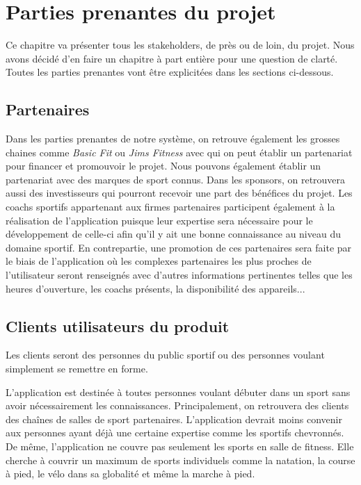 \chapter{Parties prenantes du projet}

Ce chapitre va présenter tous les stakeholders, de près ou de loin, du projet. Nous avons décidé d'en faire un chapitre à part entière pour une question de clarté. Toutes les parties prenantes vont être explicitées dans les sections ci-dessous.

\section{Partenaires}

Dans les parties prenantes de notre système, on retrouve également les grosses chaines comme \textit{Basic Fit} ou \textit{Jims Fitness} avec qui on peut établir un partenariat pour financer et promouvoir le projet. Nous pouvons également établir un partenariat avec des marques de sport connus. Dans les sponsors, on retrouvera aussi des investisseurs qui pourront recevoir une part des bénéfices du projet. Les coachs sportifs appartenant aux firmes partenaires participent également à la réalisation de l'application puisque leur expertise sera nécessaire pour le développement de celle-ci afin qu'il y ait une bonne connaissance au niveau du domaine sportif. En contrepartie, une promotion de ces partenaires sera faite par le biais de l'application où les complexes partenaires les plus proches de l'utilisateur seront renseignés avec d'autres informations pertinentes telles que les heures d'ouverture, les coachs présents, la disponibilité des appareils...

\section{Clients utilisateurs du produit}

Les clients seront des personnes du public sportif ou des personnes voulant simplement se remettre en forme. 

L'application est destinée à toutes personnes voulant débuter dans un sport sans avoir nécessairement les connaissances. Principalement, on retrouvera des clients des chaînes de salles de sport partenaires. L'application devrait moins convenir aux personnes ayant déjà une certaine expertise comme les sportifs chevronnés. De même, l'application ne couvre pas seulement les sports en salle de fitness. Elle cherche à couvrir un maximum de sports individuels comme la natation, la course à pied, le vélo dans sa globalité et même la marche à pied.

